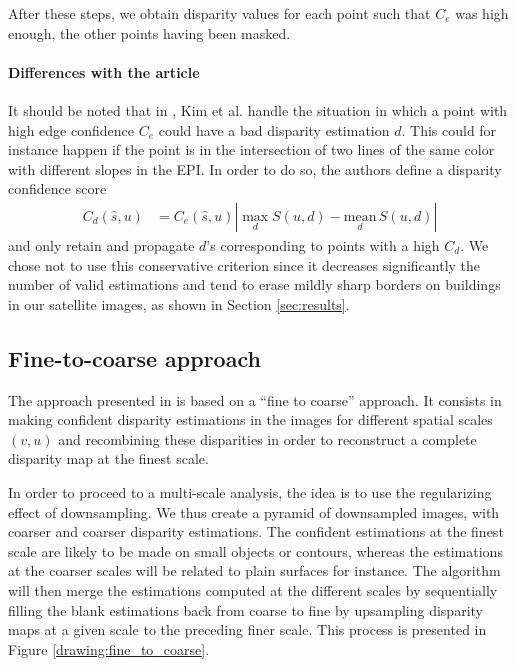 \documentclass{article}
\theoremstyle{definition}
\begin{document}
After these steps, we obtain disparity values for each point such that $C_e$ was high enough, the other points having been masked.


\paragraph{Differences with the article} It should be noted that in \cite{art:kim13:lfields}, Kim et al. handle the situation in which a point with high edge confidence $C_e$ could have a bad disparity estimation $d$. This could for instance happen if the point is in the intersection of two lines of the same color with different slopes in the EPI. In order to do so, the authors define a disparity confidence score
\begin{align}
 C_d (\widehat{s}, u) &= C_e (\widehat{s}, u) \left|\max_d S(u, d) - \underset{d}{\mathrm{mean}}\, S(u, d)\right| \label{eq:c_d}
\end{align}
and only retain and propagate $d$'s corresponding to points with a high $C_d$. We chose not to use this conservative criterion since it decreases significantly the number of valid estimations and tend to erase mildly sharp borders on buildings in our satellite images, as shown in Section \ref{sec:results}.


\subsection{Fine-to-coarse approach}


The approach presented in \cite{art:kim13:lfields} is based on a ``fine to coarse'' approach. It consists in making confident disparity estimations in the images for different spatial scales $(v, u)$ and recombining these disparities in order to reconstruct a complete disparity map at the finest scale.


In order to proceed to a multi-scale analysis, the idea is to use the regularizing effect of downsampling. We thus create a pyramid of downsampled images, with coarser and coarser disparity estimations. The confident estimations at the finest scale are likely to be made on small objects or contours, whereas the estimations at the coarser scales will be related to plain surfaces for instance. The algorithm will then merge the estimations computed at the different scales by sequentially filling the blank estimations back from coarse to fine by upsampling disparity maps at a given scale to the preceding finer scale. This process is presented in Figure \ref{drawing:fine_to_coarse}.
\end{document}
